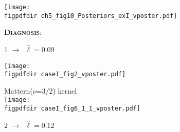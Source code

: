 \documentclass[landscape,a1,final]{a0poster} %
\let\tempone\itemize
\let\temptwo\enditemize
\renewenvironment{itemize}{\tempone\addtolength{\itemsep}{-0.3\baselineskip}}{\temptwo}
\def\figpdfdir{fig/} %
\begin{document}
\begin{minipage}{1\linewidth}
\begin{minipage}[t]{0.31\textwidth}
\begin{minipage}{0.33\textwidth}
\begin{itemize}
\item {}
\end{itemize}

\end{minipage}
\begin{minipage}{0.67\textwidth}
\centering
\texttt{[image: \\figpdfdir ch5\_fig10\_Posteriors\_exI\_vposter.pdf]}
\end{minipage}

\vspace{6mm}
\hspace{-7mm} \textsc{\textbf{\small Diagnosis}}:\\[-4mm]

\begin{minipage}[t]{0.49\textwidth}

\begin{minipage}[t]{0.45\textwidth}
{\large 1}\hspace{0.7cm}  $\to$\, {\scriptsize$\hat{\ell}=0.09$}

\vspace{0.3cm}
\texttt{[image: \\figpdfdir caseI\_fig2\_vposter.pdf]}

\end{minipage}
\begin{minipage}[t]{0.50\textwidth}
\vspace{-0.5cm}
\hspace{0.25\textwidth}  \tiny Mattern($\nu$=3/2) kernel\\
\texttt{[image: \\figpdfdir caseI\_fig6\_1\_1\_vposter.pdf]}

\end{minipage}

\end{minipage}
\begin{minipage}[t]{0.49\textwidth}

\begin{minipage}[t]{0.45\textwidth}
{\large 2}\hspace{0.7cm}  $\to$\, {\scriptsize$\hat{\ell}=0.12$}


\end{minipage}
\end{minipage}
\end{minipage}
\end{minipage}
\end{document}
